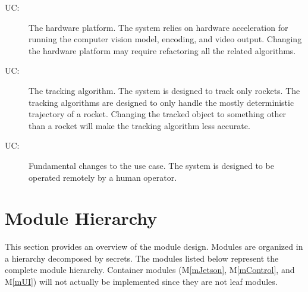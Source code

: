\documentclass[12pt, titlepage]{article}
\newcounter{ucnum}
\newcommand{\uctheucnum}{UC\theucnum}
\newcommand{\mref}[1]{M\ref{#1}}
\begin{document}
\begin{description}
  \item[ \uctheucnum \label{ucHW}:]
        The hardware platform. The system relies on hardware acceleration for running the
        computer vision model, encoding, and video output. Changing the hardware
        platform may require refactoring all the related algorithms.
  \item[ \uctheucnum \label{ucRocket}:]
        The tracking algorithm. The system is designed to track only rockets. The
        tracking algorithms are designed to only handle the mostly deterministic
        trajectory of a rocket. Changing the tracked object to something other than a
        rocket will make the tracking algorithm less accurate.
  \item[ \uctheucnum \label{ucRemote}:]
        Fundamental changes to the use case. The system is designed to be operated
        remotely by a human operator.
\end{description}

\section{Module Hierarchy} \label{SecMH}

This section provides an overview of the module design. Modules are organized
in a hierarchy decomposed by secrets. The modules listed below represent the
complete module hierarchy. Container modules (\mref{mJetson}, \mref{mControl},
and \mref{mUI}) will not actually be implemented since they are not leaf
modules.
\end{document}
